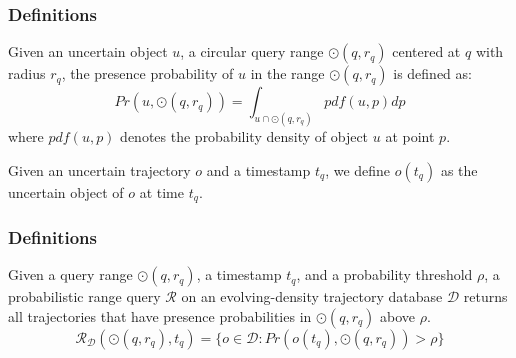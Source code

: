 \begin{frame}
\frametitle{Definitions}

\begin{definition}
  Given an uncertain object $u$, a circular query range $\odot(q, r_q)$ centered at $q$ with radius $r_q$, the presence probability of $u$ in the range $\odot(q, r_q)$ is defined as:
  \begin{equation*}
    Pr(u, \odot(q, r_q)) = \int_{u \cap \odot(q, r_q)} pdf(u, p) dp
  \end{equation*}
  where $pdf(u, p)$ denotes the probability density of object $u$ at point $p$.
\end{definition}

\begin{definition}
  Given an uncertain trajectory $o$ and a timestamp $t_q$, we define $o(t_q)$ as the uncertain object of $o$ at time $t_q$.
\end{definition}

\end{frame}


\begin{frame}
\frametitle{Definitions}

\begin{definition}
  Given a query range $\odot(q, r_q)$, a timestamp $t_q$, and a probability threshold $\rho$, a probabilistic range query $\mathcal{R}$ on an evolving-density trajectory database $\mathcal{D}$ returns all trajectories that have presence probabilities in $\odot(q, r_q)$ above $\rho$.
  \begin{equation*}
    \mathcal{R}_{\mathcal{D}}(\odot(q,r_q), t_q) = \{ o \in \mathcal{D}: Pr(o(t_q), \odot(q, r_q)) > \rho \}
  \end{equation*}
\end{definition}

\end{frame}


